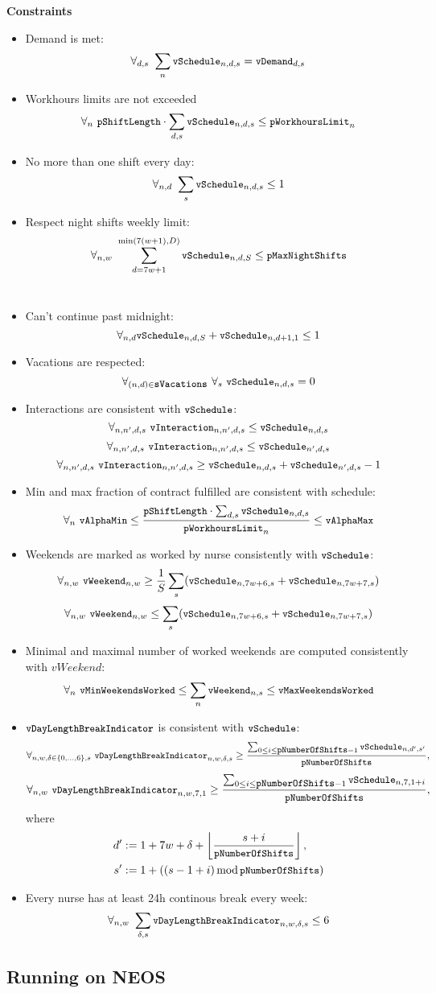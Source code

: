 \noindent\textbf{Constraints}
\begin{itemize}
    \item Demand is met:
    \[ \forall_{d,s}\ \sum_n \texttt{\small vSchedule}_{n,d,s} = \texttt{\small vDemand}_{d, s} \]
    \item Workhours limits are not exceeded
    \[ \forall_{n}\ \texttt{\small pShiftLength}\cdot\sum_{d, s} \texttt{\small vSchedule}_{n,d,s} \leq \texttt{\small pWorkhoursLimit}_n \]
    \item No more than one shift every day:
    \[ \forall_{n,d}\ \sum_s \texttt{\small vSchedule}_{n,d,s} \leq 1 \]
    \item Respect night shifts weekly limit:
    \[ \forall_{n,w}\ \sum_{d=7w+1}^{\min(7(w+1), D)} \texttt{\small vSchedule}_{n,d,S} \leq \texttt{\small pMaxNightShifts} \] \\
    \item Can't continue past midnight:
    \[ \forall_{n,d} \texttt{\small vSchedule}_{n,d,S} + \texttt{\small vSchedule}_{n,d+1,1} \leq 1 \]
    \item Vacations are respected:
    \[ \forall_{(n,d)\in \sVacations}\ \forall_s\ \vSchedule_{n,d,s} = 0 \]
    \item Interactions are consistent with $\texttt{\small vSchedule}$: 
    \[ \forall_{n,n',d,s}\ \texttt{\small vInteraction}_{n,n',d,s} \leq \texttt{\small vSchedule}_{n,d,s} \]
    \[ \forall_{n,n',d,s}\ \texttt{\small vInteraction}_{n,n',d,s} \leq \texttt{\small vSchedule}_{n',d,s} \]
    \[ \forall_{n,n',d,s}\ \texttt{\small vInteraction}_{n,n',d,s} \geq \texttt{\small vSchedule}_{n,d,s} + \texttt{\small vSchedule}_{n',d,s} - 1 \]
    \item Min and max fraction of contract fulfilled are consistent with schedule:
    \[ \forall_{n}\ \texttt{\small vAlphaMin} \leq \frac{\texttt{\small pShiftLength} \cdot \sum_{d,s} \texttt{\small vSchedule}_{n,d,s}}{\texttt{\small pWorkhoursLimit}_n} \leq \texttt{\small vAlphaMax} \]
    \item Weekends are marked as worked by nurse consistently with $\texttt{\small vSchedule}$: 
    \[ \forall_{n, w}\ \texttt{\small vWeekend}_{n, w} \geq \frac{1}{S}\sum_s (\texttt{\small vSchedule}_{n, 7w+6, s} + \texttt{\small vSchedule}_{n, 7w+7, s}) \]
    \[ \forall_{n, w}\ \texttt{\small vWeekend}_{n, w} \leq \sum_s (\texttt{\small vSchedule}_{n, 7w+6, s} + \texttt{\small vSchedule}_{n, 7w+7, s}) \]
    \item Minimal and maximal number of worked weekends are computed consistently with $vWeekend$:
    \[ \forall_{n}\ \texttt{\small vMinWeekendsWorked} \le \sum_n \texttt{\small vWeekend}_{n, s} \le \texttt{\small vMaxWeekendsWorked} \]
    \item $\texttt{\small vDayLengthBreakIndicator}$ is consistent with $\texttt{\small vSchedule}$:
    \[ \forall_{n,w,\delta  \in \{0, \dots, 6\},s}\ \vDayLengthBreakIndicator_{n, w, \delta, s} \ge \frac{\sum_{0 \le i \le \pNumberOfShifts - 1} \vSchedule_{n, d', s'}}{\pNumberOfShifts}, \]
    \[ \forall_{n,w}\ \texttt{\small vDayLengthBreakIndicator}_{n, w, 7, 1} \ge \frac{\sum_{0 \le i \le \texttt{\small pNumberOfShifts} - 1} \texttt{\small vSchedule}_{n, 7, 1 + i}}{\texttt{\small pNumberOfShifts}}, \]
    where
    \begin{align*}
        d' &:= 1+7w+\delta+\left\lfloor\frac{s+i}{\texttt{\small pNumberOfShifts}}\right\rfloor, \\
        s' &:= 1 + ((s - 1 + i) \operatorname{mod} \texttt{\small pNumberOfShifts})
    \end{align*}
    \item Every nurse has at least 24h continous break every week:
    \[ \forall_{n, w}\ \sum_{\delta, s} \texttt{\small vDayLengthBreakIndicator}_{n, w, \delta, s} \le 6 \]
\end{itemize}

\subsection{Running on NEOS}
